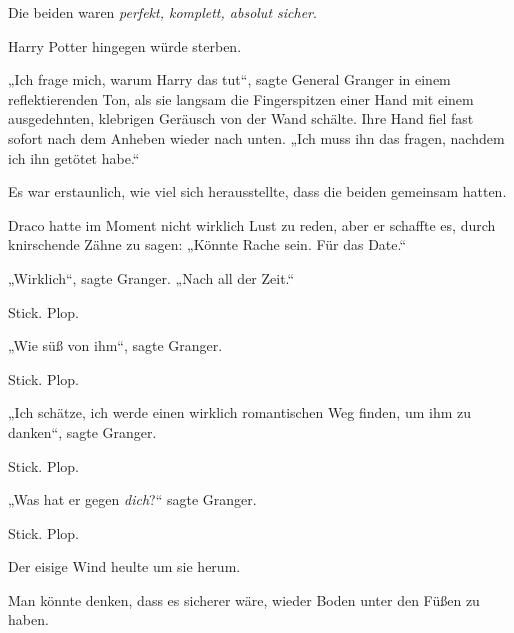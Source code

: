 Die beiden waren \emph{perfekt, komplett, absolut sicher}.

Harry Potter hingegen würde sterben.

„Ich frage mich, warum Harry das tut“, sagte General Granger in einem reflektierenden Ton, als sie langsam die Fingerspitzen einer Hand mit einem ausgedehnten, klebrigen Geräusch von der Wand schälte. Ihre Hand fiel fast sofort nach dem Anheben wieder nach unten. „Ich muss ihn das fragen, nachdem ich ihn getötet habe.“

Es war erstaunlich, wie viel sich herausstellte, dass die beiden gemeinsam hatten.

Draco hatte im Moment nicht wirklich Lust zu reden, aber er schaffte es, durch knirschende Zähne zu sagen: „Könnte Rache sein. Für das Date.“

„Wirklich“, sagte Granger. „Nach all der Zeit.“

Stick. Plop.

„Wie süß von ihm“, sagte Granger.

Stick. Plop.

„Ich schätze, ich werde einen wirklich romantischen Weg finden, um ihm zu danken“, sagte Granger.

Stick. Plop.

„Was hat er gegen \emph{dich}?“ sagte Granger.

Stick. Plop.

Der eisige Wind heulte um sie herum.

\later

Man könnte denken, dass es sicherer wäre, wieder Boden unter den Füßen zu haben.

